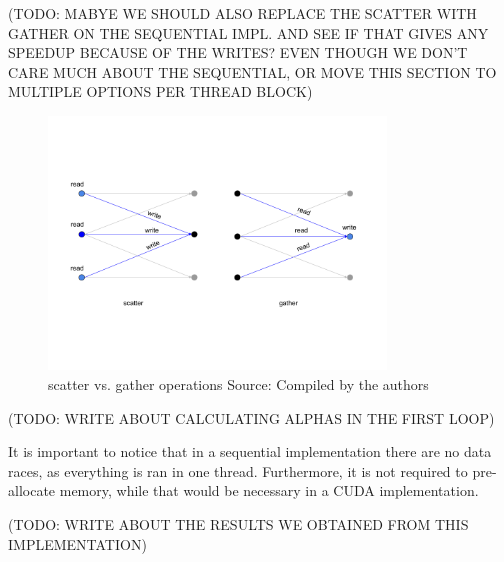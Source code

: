 (TODO: MABYE WE SHOULD ALSO REPLACE THE SCATTER WITH GATHER ON THE SEQUENTIAL IMPL. AND SEE IF THAT GIVES ANY SPEEDUP BECAUSE OF THE WRITES? EVEN THOUGH WE DON'T CARE MUCH ABOUT THE SEQUENTIAL, OR MOVE THIS SECTION TO MULTIPLE OPTIONS PER THREAD BLOCK)

\begin{figure}[H]
	\centering
	\includegraphics[width=0.8\textwidth]{img/scattervsgather.png}
	\caption{scatter vs. gather operations Source: Compiled by the authors}
	\label{fig:scattervsgather}
\end{figure}

(TODO: WRITE ABOUT CALCULATING ALPHAS IN THE FIRST LOOP)

It is important to notice that in a sequential implementation there are no data races, as everything is ran in one thread. Furthermore, it is not required to pre-allocate memory, while that would be necessary in a CUDA implementation. 

(TODO: WRITE ABOUT THE RESULTS WE OBTAINED FROM THIS IMPLEMENTATION)